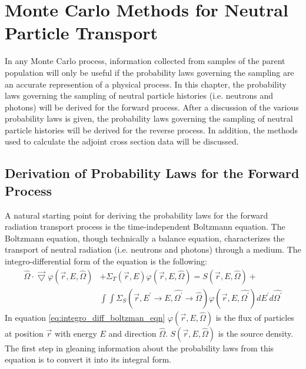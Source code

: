 \chapter{Monte Carlo Methods for Neutral Particle Transport}
\label{ch:neutral_particle_transport}
In any Monte Carlo process, information collected from samples of the parent 
population will only be useful if the probability laws governing the sampling
are an accurate represention of a physical process. In this chapter, the 
probability laws governing the sampling of neutral particle histories (i.e. 
neutrons and photons) will be derived for the forward process. After a 
discussion of the various probability laws is given, the probability laws
governing the sampling of neutral particle histories will be derived for the
reverse process. In addition, the methods used to calculate the adjoint
cross section data will be discussed.

\section{Derivation of Probability Laws for the Forward Process}
\label{sec:der_prob_laws_for_proc}
A natural starting point for deriving the probability laws for the forward 
radiation transport process is the time-independent Boltzmann equation. 
The Boltzmann equation, 
though technically a balance equation, characterizes the transport of neutral 
radiation (i.e. neutrons and photons) through a medium. The integro-differential
form of the equation is the following:
\begin{equation}
  \begin{split}
    \hat{\Omega} \cdot \vec{\bigtriangledown} \varphi(\vec{r},E,\hat{\Omega})
    & + \Sigma_T(\vec{r},E) \varphi(\vec{r},E,\hat{\Omega}) = 
    S(\vec{r},E,\hat{\Omega}) + \\
    & \int\int \Sigma_S(\vec{r},E^{'} \to E,\hat{\Omega^{'}} \to \hat{\Omega})
  \varphi(\vec{r},E,\hat{\Omega^{'}}) dE^{'}d\hat{\Omega^{'}}
  \end{split}
  \label{eq:integro_diff_boltzman_eqn}
\end{equation}
In equation \ref{eq:integro_diff_boltzman_eqn} $\varphi(\vec{r},E,\hat{\Omega})$
is the flux of particles at position $\vec{r}$ with energy $E$ and direction
$\hat{\Omega}$. $S(\vec{r},E,\hat{\Omega})$ is the source density. The first
step in gleaning information about the probability laws from this equation is
to convert it into its integral form. 

